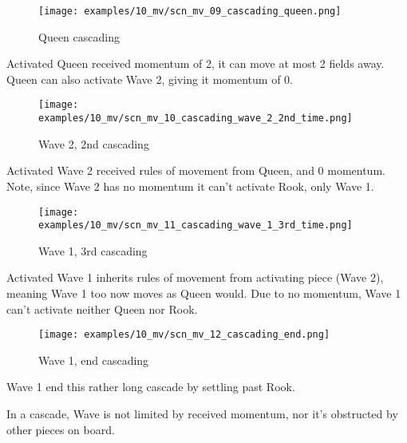 \vspace*{0.155\textheight}
\noindent
\begin{wrapfigure}[10]{r}{0.5625\textwidth}
\centering
\texttt{[image: examples/10\_mv/scn\_mv\_09\_cascading\_queen.png]}
\caption{Queen cascading}
\label{fig:scn_mv_09_cascading_queen}
\end{wrapfigure}
Activated Queen received momentum of 2, it can move at most 2 fields away.
Queen can also activate Wave 2, giving it momentum of 0.

\clearpage %

\noindent
\begin{wrapfigure}[7]{l}{0.5625\textwidth}
\centering
\texttt{[image: examples/10\_mv/scn\_mv\_10\_cascading\_wave\_2\_2nd\_time.png]}
\caption{Wave 2, 2nd cascading}
\label{fig:scn_mv_10_cascading_wave_2_2nd_time}
\end{wrapfigure}
Activated Wave 2 received rules of movement from Queen, and 0 momentum.
Note, since Wave 2 has no momentum it can't activate Rook, only Wave 1.

\vspace*{0.245\textheight}
\noindent
\begin{wrapfigure}[9]{r}{0.5625\textwidth}
\centering
\texttt{[image: examples/10\_mv/scn\_mv\_11\_cascading\_wave\_1\_3rd\_time.png]}
\caption{Wave 1, 3rd cascading}
\label{fig:scn_mv_11_cascading_wave_1_3rd_time}
\end{wrapfigure}
Activated Wave 1 inherits rules of movement from activating piece (Wave 2),
meaning Wave 1 too now moves as Queen would. Due to no momentum, Wave 1 can't
activate neither Queen nor Rook.

\clearpage %

\noindent
\begin{wrapfigure}[3]{l}{0.5625\textwidth}
\centering
\texttt{[image: examples/10\_mv/scn\_mv\_12\_cascading\_end.png]}
\caption{Wave 1, end cascading}
\label{fig:scn_mv_12_cascading_end}
\end{wrapfigure}
Wave 1 end this rather long cascade by settling past Rook.

\vspace*{0.345\textheight}
In a cascade, Wave is not limited by received momentum, nor it's obstructed by
other pieces on board.

